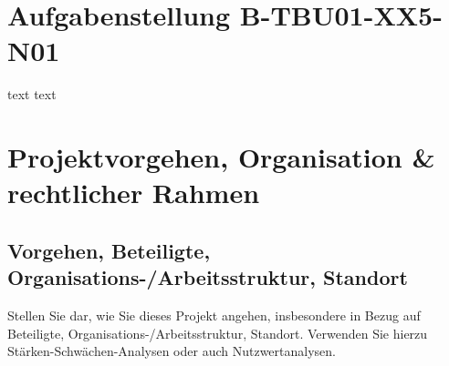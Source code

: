 \documentclass[
%
ngerman %
%
numeric %
]{wbh-assignment}
\begin{document}

\onehalfspacing
{}
\tableofcontents %
\cleardoublepage


\renewcommand{\sectionmark}[1]{\markright{#1}}
\renewcommand{\subsectionmark}[1]{}
\renewcommand{\subsubsectionmark}[1]{}

\onehalfspacing
\renewcommand{\thesection}{\arabic{section}}
\renewcommand{\theHsection}{\arabic{section}}
\setcounter{section}{0}

\section*{Aufgabenstellung B-TBU01-XX5-N01}
text
\cleardoublepage
text
\cleardoublepage

\section{Projektvorgehen, Organisation \& rechtlicher Rahmen}
\label{sec:1}

\subsection{Vorgehen, Beteiligte, Organisations-/Arbeitsstruktur, Standort}
\begin{aufgabenstellung}
Stellen Sie dar, wie Sie dieses Projekt angehen, insbesondere in Bezug auf Beteiligte, Organisations-/Arbeitsstruktur, Standort.
Verwenden Sie hierzu Stärken-Schwächen-Analysen oder auch Nutzwertanalysen.
\end{aufgabenstellung}
\end{document}
